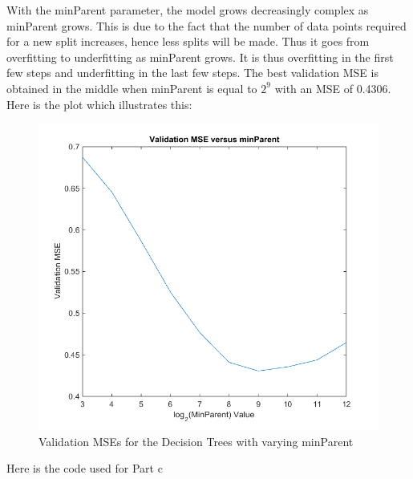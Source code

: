 \documentclass[twoside,11pt]{article}
\theoremstyle{definition}
\begin{document}
With the minParent parameter, the model grows decreasingly complex as minParent grows. This is due to the fact that the number of data points required for a new split increases, hence less splits will be made. Thus it goes from overfitting to underfitting as minParent grows. It is thus overfitting in the first few steps and underfitting in the last few steps. The best validation MSE is obtained in the middle when minParent is equal to $2^9$ with an MSE of 0.4306. Here is the plot which illustrates this:

\begin{figure}[h]
\centering
\includegraphics[width=6 in]{prob3plot2.png}
\caption{Validation MSEs for the Decision Trees with varying minParent}
\end{figure}

\newpage

Here is the code used for Part c\\

\end{document}
